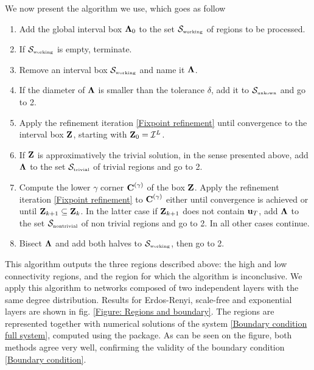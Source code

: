 \documentclass[
11pt, %
american, %
singlespacing, %
final, %
nolistspacing, %
liststotoc, %
headsepline, %
]{MastersDoctoralThesis} %
\begin{document}
We now present the algorithm we use, which goes as follow
\begin{enumerate}
	\item Add the global interval box $\boldsymbol{\mathrm{\Lambda}}_0$ to the set $\mathcal{S}_{\text{\tiny working}}$ of regions to be processed.
	\item If $\mathcal{S}_{\text{\tiny working}}$ is empty, terminate.
	\item Remove an interval box $\mathcal{S}_{\text{\tiny working}}$ and name it $\boldsymbol{\mathrm{\Lambda}}$.
	\item If the diameter of $\boldsymbol{\mathrm{\Lambda}}$ is smaller than the tolerance $\delta$, add it to $\mathcal{S}_{\text{\tiny unkown}}$ and go to 2.
	\item Apply the refinement iteration \eqref{Fixpoint refinement} until convergence to the interval box $\boldsymbol{\mathrm{Z}}$, starting with $\boldsymbol{\mathrm{Z}}_0 = \mathcal{I}^L$.
	\item If $\boldsymbol{\mathrm{Z}}$ is approximatively the trivial solution, in the sense presented above, add $\boldsymbol{\mathrm{\Lambda}}$ to the set $\mathcal{S}_{\text{\tiny trivial}}$ of trivial regions and go to 2.
	\item Compute the lower $\gamma$ corner $\boldsymbol{\mathrm{C}}^{(\gamma)}$ of the box $\boldsymbol{\mathrm{Z}}$. Apply the refinement iteration \eqref{Fixpoint refinement} to $\boldsymbol{\mathrm{C}}^{(\gamma)}$ either until convergence is achieved or until $\boldsymbol{\mathrm{Z}}_{k + 1} \subseteq \boldsymbol{\mathrm{Z}}_k$. In the latter case if $\boldsymbol{\mathrm{Z}}_{k + 1}$ does not contain $\boldsymbol{\mathrm{u}}_T$, add $\boldsymbol{\mathrm{\Lambda}}$ to the set $\mathcal{S}_{\text{\tiny nontrivial}}$ of non trivial regions and go to 2. In all other cases continue.
	\item Bisect $\boldsymbol{\mathrm{\Lambda}}$ and add both halves to $\mathcal{S}_{\text{\tiny working}}$, then go to 2.
\end{enumerate}

This algorithm outputs the three regions described above: the high and low connectivity regions, and the region for which the algorithm is inconclusive. We apply this algorithm to networks composed of two independent layers with the same degree distribution. Results for Erdos-Renyi, scale-free and exponential layers are shown in fig. \ref{Figure: Regions and boundary}. The regions are represented together with numerical solutions of the system \eqref{Boundary condition full system}, computed using the  \cite{nlsolve} package. As can be seen on the figure, both methods agree very well, confirming the validity of the boundary condition \eqref{Boundary condition}.
\end{document}
